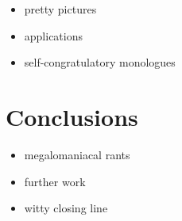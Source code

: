 \documentclass[runningheads]{cl2emult}
\begin{document}
\begin{itemize}
\item pretty pictures
\item applications
\item self-congratulatory monologues
\end{itemize}

\section{Conclusions}
\label{sec:conclusions}
\begin{itemize}
\item megalomaniacal rants
\item further work
\item witty closing line
\end{itemize}

%
%
%
%
%
%
%


\newpage
{}


%
\end{document}

